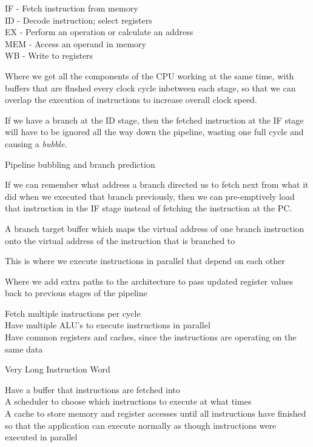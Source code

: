 {IF - Fetch instruction from memory\\
ID - Decode instruction; select registers\\
EX - Perform an operation or calculate an address\\
MEM - Access an operand in memory\\
WB - Write to registers}

{Where we get all the components of the CPU working at the same time, with buffers that are flushed every clock cycle inbetween each stage, so that we can overlap the execution of instructions to increase overall clock speed.}

{If we have a branch at the ID stage, then the fetched instruction at the IF stage will have to be ignored all the way down the pipeline, wasting one full cycle and causing a \textit{bubble}.}

{Pipeline bubbling and branch prediction}

{If we can remember what address a branch directed us to fetch next from what it did when we executed that branch previously, then we can pre-emptively load that instruction in the IF stage instead of fetching the instruction at the PC.}

{A branch target buffer which maps the virtual address of one branch instruction onto the virtual address of the instruction that is branched to}

{This is where we execute instructions in parallel that depend on each other}

{Where we add extra paths to the architecture to pass updated register values back to previous stages of the pipeline}

{Fetch multiple instructions per cycle\\
Have multiple ALU's to execute instructions in parallel\\
Have common registers and caches, since the instructions are operating on the same data}

{Very Long Instruction Word}

{Have a buffer that instructions are fetched into\\
A scheduler to choose which instructions to execute at what times\\
A cache to store memory and register accesses until all instructions have finished so that the application can execute normally as though instructions were executed in parallel}

